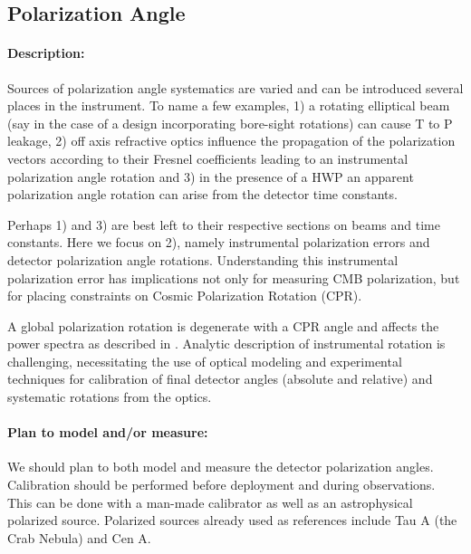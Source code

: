 \subsection{Polarization Angle}

\paragraph{Description:}

Sources of polarization angle systematics are varied and can be introduced
several places in the instrument. To name a few examples, 1) a rotating elliptical beam (say
in the case of a design incorporating bore-sight rotations) can cause T to P
leakage, 2) off axis refractive optics influence the propagation of the
polarization vectors according to their Fresnel coefficients leading to an
instrumental polarization angle rotation and 3) in the presence of a HWP an
apparent polarization angle rotation can arise from the detector time
constants. 

Perhaps 1) and 3) are best left to their respective sections on beams and time
constants. Here we focus on 2), namely instrumental polarization errors and
detector polarization angle rotations. Understanding this instrumental
polarization error has implications not only for measuring CMB polarization,
but for placing constraints on Cosmic Polarization Rotation (CPR).

A global polarization rotation is degenerate with a CPR angle and affects the
power spectra as described in \cite{2013ApJ...762L..23K}. Analytic description
of instrumental rotation is challenging, necessitating the use of optical
modeling and experimental techniques for calibration of final detector angles
(absolute and relative) and systematic rotations from the optics.

\paragraph{Plan to model and/or measure:}
We should plan to both model and measure the detector polarization angles.
Calibration should be performed before deployment and during observations. This
can be done with a man-made calibrator as well as an astrophysical polarized
source. Polarized sources already used as references include Tau A (the Crab
Nebula) and Cen A.

